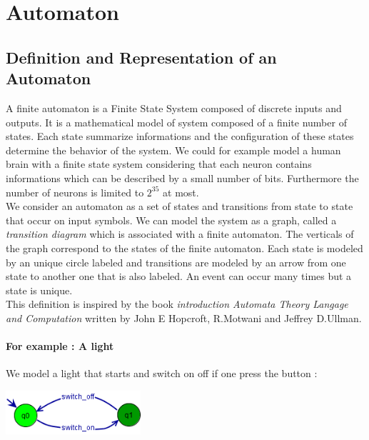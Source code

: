 \chapter{Automaton}

\section{Definition and Representation of an Automaton}
A finite automaton is a Finite State System composed of discrete inputs and outputs. It is a mathematical model of system composed of a finite number of states. Each state summarize informations and the configuration of these states determine the behavior of the system. We could for example model a human brain with a finite state system considering that each neuron contains informations which can be described by a small number of bits. Furthermore the number of neurons is limited to $2^{35}$ at most.\\
We consider an automaton as a set of states and transitions from state to state that occur on input symbols. We can model the system as a graph, called a \textit{transition diagram} which is associated with a finite automaton. The verticals of the graph correspond to the states of the finite automaton. Each state is modeled by an unique circle labeled and transitions are modeled by an arrow from one state to another one that is also labeled. An event can occur many times but a state is unique.\\
This definition is inspired by the book \textit{introduction Automata Theory Langage and Computation} written by John E Hopcroft, R.Motwani and Jeffrey D.Ullman. \cite{introductionAutomataTheoryLangageComputation_2007}\\

\subsubsection*{For example : A light}
We model a light that starts and switch on off if one press the button :
\begin{center}
      \includegraphics[width = 5cm]{./IV/ex1.png}
      \vspace{0.5cm}
\end{center}

